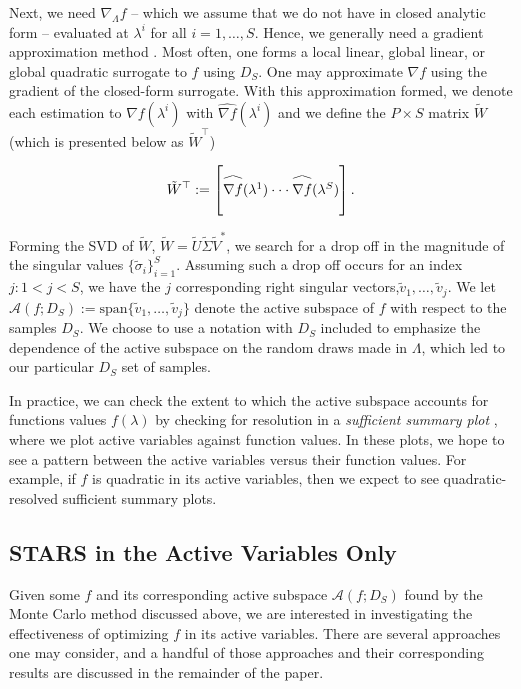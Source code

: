 \documentclass{amsart}
\newcommand{\A}{\mathcal{A}}
\newcommand\reallywidehat[1]{\arraycolsep=0pt\relax%
\begin{array}{c}
\stretchto{
  \scaleto{
    \scalerel*[\widthof{\ensuremath{#1}}]{\kern-.5pt\bigwedge\kern-.5pt}
    {\rule[-\textheight/2]{1ex}{\textheight}} %
  }{\textheight} %
}{0.5ex}\\           %
#1\\                 %
\rule{-1ex}{0ex}
\end{array}
}
\begin{document}
Next, we need $\nabla_\Lambda f$ -- which we assume that we do not have in closed analytic form -- evaluated at $\lambda^i$ for all $i=1,\ldots,S$. Hence, we generally need a gradient approximation method \cite{Constantine2015, Smith}. Most often, one forms a local linear, global linear, or global quadratic surrogate to $f$ using $D_S$. One may approximate $\nabla f$ using the gradient of the closed-form surrogate. With this approximation formed, we denote each estimation to $\nabla f(\lambda^i)$ with $\hat{\nabla f}(\lambda^i)$ and we define the $P \times S$ matrix $\tilde{W}$ (which is presented below as $\tilde{W}^\top$)

\begin{equation} \label{eq:10}
\tilde{W}^\top:=\begin{bmatrix}
\reallywidehat{\nabla f}(\lambda^1)
\cdot \cdot \cdot
\reallywidehat{\nabla f}(\lambda^S)\\
\end{bmatrix}.
\end{equation}  

Forming the SVD of $\tilde{W}$, $\tilde{W}=\tilde{U}\tilde{\Sigma}\tilde{V}^*$, we search for a drop off in the magnitude of the singular values $\{\tilde{\sigma}_i\}_{i=1}^S$. Assuming such a drop off occurs for an index $j:1<j<S$, we have the $j$ corresponding right singular vectors,$ \tilde{v}_1,\ldots,\tilde{v}_{j}$.  We let $\A\left(f; D_S \right):=\text{span}\{\tilde{v}_1,\ldots,\tilde{v}_{j}\}$ denote the active subspace of $f$ with respect to the samples $D_S$. We choose to use a notation with $D_S$ included to emphasize the dependence of the active subspace on the random draws made in $\Lambda$, which led to our particular $D_S$ set of samples.

In practice, we can check the extent to which the active subspace accounts for functions values $f(\lambda)$ 
by checking for resolution in a \emph{sufficient summary plot} \cite{Constantine2015}, where we plot active variables against function values. In these plots, we hope to see a pattern between the active variables versus their function values. For example, if $f$ is quadratic in its active variables, then we expect to see quadratic-resolved sufficient summary plots.











\subsection{STARS in the Active Variables Only} Given some $f$ and its corresponding active subspace $\A(f;D_S)$ found by the Monte Carlo method discussed above, we are interested in investigating the effectiveness of optimizing $f$ in its active variables. There are several approaches one may consider, and a handful of those approaches and their corresponding results are discussed in the remainder of the paper. 
\end{document}
